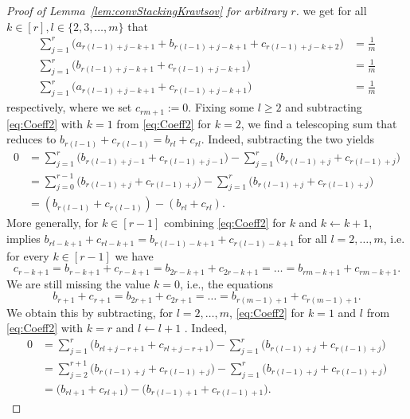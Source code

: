 \begin{proof}[Proof of Lemma~\ref{lem:convStackingKravtsov} for arbitrary $r$]
	we get for all $k \in [r], l \in \{2,3,\ldots,m\}$ that
	\begin{align}
		\sum_{j=1}^r \big( a_{r(l-1)+j - k + 1} + b_{r(l-1)+j - k + 1} + c_{r(l-1)+j- k + 2} \big) &= \frac{1}{m} \label{eq:Coeff1} \\
		\sum_{j=1}^{r} \big( b_{r(l-1)+j - k + 1} + c_{r(l-1)+j - k + 1} \big) &= \frac{1}{m} \label{eq:Coeff2} \\
		\sum_{j=1}^{r} \big( a_{r(l-1)+j - k + 1} + c_{r(l-1)+j - k + 1} \big) &= \frac{1}{m} \label{eq:Coeff3}
	\end{align}
	respectively, where we set  $c_{r m + 1} := 0$. Fixing some $l \geq 2$ and subtracting \eqref{eq:Coeff2} with $k = 1$ from \eqref{eq:Coeff2} for $k= 2$, we find a telescoping sum that reduces to $b_{r(l-1)} + c_{r(l-1)} = b_{r l} + c_{r l}$. Indeed, subtracting the two yields
	\begin{align*}
		0 &= \sum_{j=1}^{r} \big( b_{r(l-1)+j - 1} + c_{r(l-1)+j - 1} \big) - \sum_{j=1}^{r} \big( b_{r(l-1)+j} + c_{r(l-1)+j} \big) \\
		&= \sum_{j=0}^{r-1} \big( b_{r(l-1)+j } + c_{r(l-1)+j } \big)  - \sum_{j=1}^{r} \big( b_{r(l-1)+j} + c_{r(l-1)+j} \big) \\
		&= ( b_{r(l-1)} + c_{r(l-1)}) - (b_{r l} + c_{r l}).
	\end{align*}
	More generally, for $k \in  [r-1]$ combining \eqref{eq:Coeff2} for $k$ and $k \leftarrow k + 1$, implies 
	$b_{r l - k + 1} + c_{r l - k + 1} = b_{r(l-1)- k + 1} + c_{r(l-1)- k + 1}$
	for all $l = 2,\ldots,m$, i.e. for every $k \in [r - 1]$ we have
	\begin{equation}\label{eq:StackBandC1}
		c_{r - k + 1} = b_{r - k + 1} + c_{r - k+ 1} = b_{2r - k + 1} + c_{2r - k + 1} = \ldots = b_{r m - k + 1} + c_{r m - k + 1}.
	\end{equation}
	We are still missing the value $k = 0$, i.e., the equations 
	\begin{equation}\label{eq:StackBandC2}
		b_{r+1} + c_{r+1} = b_{2r + 1} + c_{2r + 1} = \ldots = b_{r(m-1) + 1} + c_{r(m-1) + 1}.
	\end{equation}
	We obtain this by subtracting, for $l = 2, \dots, m$,  \eqref{eq:Coeff2} for $k = 1$ and $l$ from \eqref{eq:Coeff2} with $k = r$ and $l \leftarrow l + 1$ . Indeed, 
	\begin{align*}0 &= \sum_{j=1}^{r} \big( b_{r l+j - r + 1} + c_{r l +j - r + 1} \big) - \sum_{j=1}^{r} \big( b_{r(l-1)+j} + c_{r(l-1)+j} \big) \\
		&= \sum_{j=2}^{r+1} \big( b_{r(l-1)+j } + c_{r(l-1) +j}\big) - \sum_{j=1}^{r} \big( b_{r(l-1)+j} + c_{r(l-1)+j} \big) \\
		&= \big( b_{r l + 1} + c_{r l + 1}\big) - \big( b_{r(l-1)+1} + c_{r(l-1)+1} \big).
	\end{align*}
	

\end{proof}
